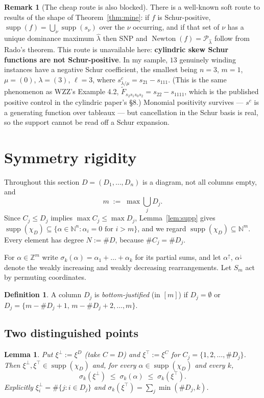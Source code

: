 \documentclass[11pt]{article}
\newtheorem{lem}[thm]{Lemma}
\theoremstyle{definition}
\newtheorem{defn}[thm]{Definition}
\newtheorem{rem}[thm]{Remark}
\DeclareMathOperator{\supp}{supp}
\DeclareMathOperator{\Newton}{Newton}
\newcommand{\Z}{\mathbb{Z}}
\newcommand{\N}{\mathbb{N}}
\begin{document}
\begin{rem}[The cheap route is also blocked]\label{rem:cheap}
There is a well-known soft route to results of the shape of Theorem~\ref{thm:mine}: if $f$ is
Schur-positive, $\supp(f)=\bigcup_{\nu}\supp(s_\nu)$ over the $\nu$ occurring, and if that set
of $\nu$ has a unique dominance maximum $\hat\lambda$ then SNP and
$\Newton(f)=\mathcal{P}_{\hat\lambda}$ follow from Rado's theorem. This route is unavailable
here: \textbf{cylindric skew Schur functions are not Schur-positive}. In my sample, $13$
genuinely winding instances have a negative Schur coefficient, the smallest being $n=3$, $m=1$,
$\mu=(0)$, $\lambda=(3)$, $\ell=3$, where $s^c_{\lambda/\mu}=s_{21}-s_{111}$. (This is the same
phenomenon as WZZ's Example 4.2, $\widetilde F_{s_2s_1s_0s_2}=s_{22}-s_{1111}$, which is the
published positive control in the cylindric paper's \S8.) Monomial positivity survives ---
$s^c$ is a generating function over tableaux --- but cancellation in the Schur basis is real,
so the support cannot be read off a Schur expansion.
\end{rem}

\section{Symmetry rigidity}\label{sec:rigidity}

Throughout this section $D=(D_1,\dots,D_n)$ is a diagram, not all columns empty, and
\[
  m\;:=\;\max\bigcup_{j}D_j .
\]
Since $C_j\le D_j$ implies $\max C_j\le\max D_j$, Lemma~\ref{lem:supp} gives
$\supp(\chi_D)\subseteq\{\alpha\in\N^n:\alpha_i=0\text{ for }i>m\}$, and we regard
$\supp(\chi_D)\subseteq\N^m$. Every element has degree $N:=\#D$, because $\#C_j=\#D_j$.

For $\alpha\in\Z^m$ write $\sigma_k(\alpha)=\alpha_1+\dots+\alpha_k$ for its partial sums, and
let $\alpha^\uparrow$, $\alpha^\downarrow$ denote the weakly increasing and weakly decreasing
rearrangements. Let $S_m$ act by permuting coordinates.

\begin{defn}
A column $D_j$ is \emph{bottom-justified} (in $[m]$) if $D_j=\emptyset$ or
$D_j=\{m-\#D_j+1,\,m-\#D_j+2,\dots,m\}$.
\end{defn}

\subsection{Two distinguished points}

\begin{lem}\label{lem:minmax}
Put $\xi^{\perp}:=\xi^{D}$ (take $C=D$) and $\xi^{\top}:=\xi^{C}$ for
$C_j=\{1,2,\dots,\#D_j\}$. Then $\xi^{\perp},\xi^{\top}\in\supp(\chi_D)$ and, for every
$\alpha\in\supp(\chi_D)$ and every $k$,
\[
  \sigma_k(\xi^{\perp})\;\le\;\sigma_k(\alpha)\;\le\;\sigma_k(\xi^{\top}).
\]
Explicitly $\xi^{\perp}_i=\#\{j:i\in D_j\}$ and $\sigma_k(\xi^{\top})=\sum_j\min(\#D_j,k)$.
\end{lem}
\end{document}
